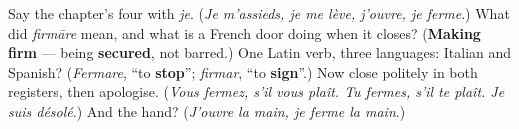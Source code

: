 \begin{tcolorbox}[breakable,colback=teal!4,colframe=teal!35!black,title={Before you move on}]
Say the chapter's four with \emph{je}. (\emph{Je m'assieds, je me lève, j'ouvre, je ferme}.) What did \emph{firmāre} mean, and what is a French door doing when it closes? (\textbf{Making firm} — being \textbf{secured}, not barred.) One Latin verb, three languages: Italian and Spanish? (\emph{Fermare}, \textquotedblleft{}to \textbf{stop}\textquotedblright{}; \emph{firmar}, \textquotedblleft{}to \textbf{sign}\textquotedblright{}.) Now close politely in both registers, then apologise. (\emph{Vous fermez, s'il vous plaît. Tu fermes, s'il te plaît. Je suis désolé}.) And the hand? (\emph{J'ouvre la main, je ferme la main}.)
\end{tcolorbox}
